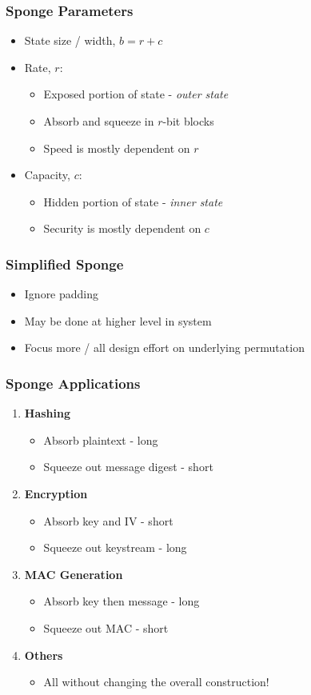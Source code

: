 \begin{frame}
\frametitle{Sponge Parameters}
\begin{itemize}
  \item State size / width, $b = r + c$
  \item Rate, $r$:
  \begin{itemize}
    \item Exposed portion of state - \emph{outer state}
    \item Absorb and squeeze in $r$-bit blocks
    \item Speed is mostly dependent on $r$
  \end{itemize}
  \item Capacity, $c$:
  \begin{itemize}
    \item Hidden portion of state - \emph{inner state}
    \item Security is mostly dependent on $c$
  \end{itemize}
\end{itemize}
\end{frame}

\begin{frame}
\frametitle{Simplified Sponge}
\begin{itemize}
  \item Ignore padding 
  \item May be done at higher level in system
  \item Focus more / all design effort on underlying permutation
\end{itemize}
\end{frame}

\begin{frame}
\frametitle{Sponge Applications}
\begin{enumerate}
  \item \textbf{Hashing}
  \begin{itemize}
    \item Absorb plaintext - long
    \item Squeeze out message digest - short
  \end{itemize}
  \item \textbf{Encryption} 
  \begin{itemize}
    \item Absorb key and IV - short
    \item Squeeze out keystream - long
  \end{itemize}
  \item \textbf{MAC Generation}
  \begin{itemize}
    \item Absorb key then message - long 
    \item Squeeze out MAC - short
  \end{itemize}
  \item \textbf{Others}
  \begin{itemize}
    \item All without changing the overall construction!
  \end{itemize}
\end{enumerate}
\end{frame}

